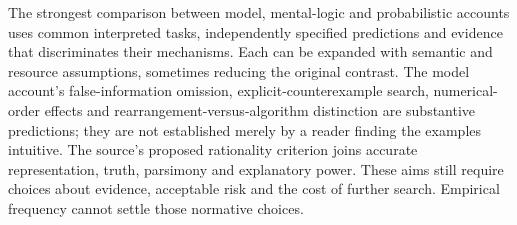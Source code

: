 The strongest comparison between model, mental-logic and probabilistic
accounts uses common interpreted tasks, independently specified
predictions and evidence that discriminates their mechanisms. Each can
be expanded with semantic and resource assumptions, sometimes reducing
the original contrast. The model account's false-information omission,
explicit-counterexample search, numerical-order effects and
rearrangement-versus-algorithm distinction are substantive predictions;
they are not established merely by a reader finding the examples
intuitive. The source's proposed rationality criterion joins accurate
representation, truth, parsimony and explanatory power. These aims still
require choices about evidence, acceptable risk and the cost of further
search. Empirical frequency cannot settle those normative choices.
